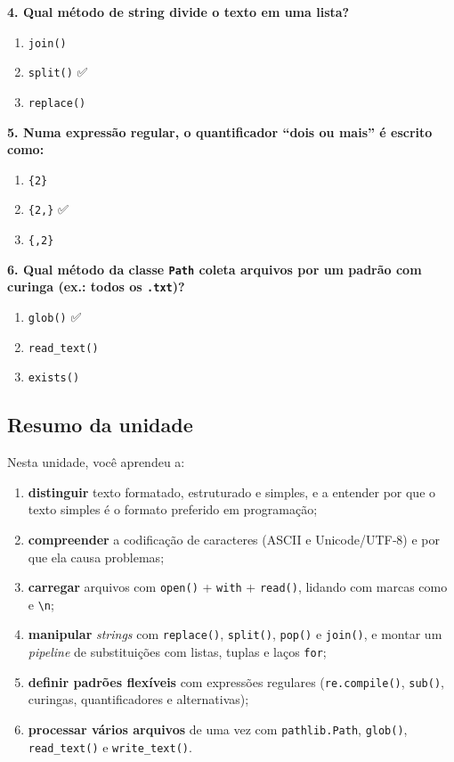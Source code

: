 \documentclass[
  brazilian,
  11pt,
]{article}
\providecommand{\tightlist}{%
  \setlength{\itemsep}{0pt}\setlength{\parskip}{0pt}}
\let\oldtexttt\texttt
\renewcommand{\texttt}[1]{{\color{inlink}\oldtexttt{#1}}}
\begin{document}
\textbf{4. Qual método de string divide o texto em uma lista?}

\begin{enumerate}
\def\labelenumi{\arabic{enumi}.}
\tightlist
\item
  \texttt{join()}
\item
  \texttt{split()} ✅
\item
  \texttt{replace()}
\end{enumerate}

\textbf{5. Numa expressão regular, o quantificador ``dois ou mais'' é
escrito como:}

\begin{enumerate}
\def\labelenumi{\arabic{enumi}.}
\tightlist
\item
  \texttt{\{2\}}
\item
  \texttt{\{2,\}} ✅
\item
  \texttt{\{,2\}}
\end{enumerate}

\textbf{6. Qual método da classe \texttt{Path} coleta arquivos por um
padrão com curinga (ex.: todos os \texttt{.txt})?}

\begin{enumerate}
\def\labelenumi{\arabic{enumi}.}
\tightlist
\item
  \texttt{glob()} ✅
\item
  \texttt{read\_text()}
\item
  \texttt{exists()}
\end{enumerate}

\subsection{Resumo da unidade}\label{resumo-da-unidade}

Nesta unidade, você aprendeu a:

\begin{enumerate}
\def\labelenumi{\arabic{enumi}.}
\tightlist
\item
  \textbf{distinguir} texto formatado, estruturado e simples, e a
  entender por que o texto simples é o formato preferido em programação;
\item
  \textbf{compreender} a codificação de caracteres (ASCII e
  Unicode/UTF‑8) e por que ela causa problemas;
\item
  \textbf{carregar} arquivos com \texttt{open()} + \texttt{with} +
  \texttt{read()}, lidando com marcas como \texttt{﻿} e
  \texttt{\textbackslash{}n};
\item
  \textbf{manipular} \emph{strings} com \texttt{replace()},
  \texttt{split()}, \texttt{pop()} e \texttt{join()}, e montar um
  \emph{pipeline} de substituições com listas, tuplas e laços
  \texttt{for};
\item
  \textbf{definir padrões flexíveis} com expressões regulares
  (\texttt{re.compile()}, \texttt{sub()}, curingas, quantificadores e
  alternativas);
\item
  \textbf{processar vários arquivos} de uma vez com
  \texttt{pathlib.Path}, \texttt{glob()}, \texttt{read\_text()} e
  \texttt{write\_text()}.
\end{enumerate}
\end{document}
